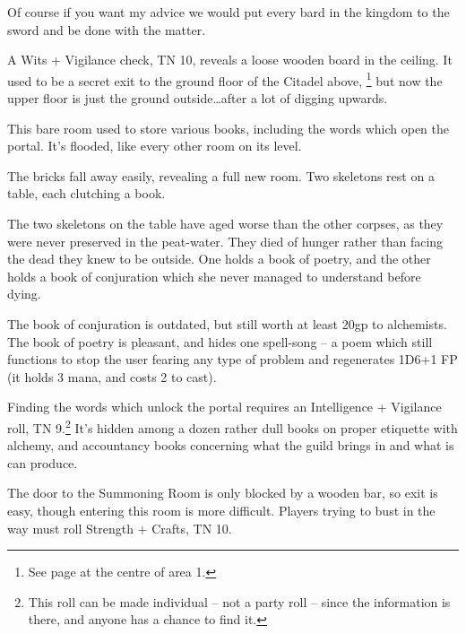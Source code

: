 \begin{multicols}{2}
\begin{exampletext}
  Of course if you want my advice we would put every bard in the kingdom to the sword and be done with the matter.

\end{exampletext}

A Wits + Vigilance check, TN 10, reveals a loose wooden board in the ceiling.
It used to be a secret exit to the ground floor of the Citadel above,%
\footnote{See page \pageref{lost_citadel} at the centre of area 1.}
but now the upper floor is just the ground outside\ldots after a lot of digging upwards.


This bare room used to store various books, including the words which open the portal.  It's flooded, like every other room on its level.

\begin{boxtext}

  The bricks fall away easily, revealing a full new room.  Two skeletons rest on a table, each clutching a book.

\end{boxtext}

The two skeletons on the table have aged worse than the other corpses, as they were never preserved in the peat-water.
They died of hunger rather than facing the dead they knew to be outside.
One holds a book of poetry, and the other holds a book of conjuration which she never managed to understand before dying.

The book of conjuration is outdated, but still worth at least 20gp to \gls{alchemists}.
The book of poetry is pleasant, and hides one spell-song -- a poem which still functions to stop the user fearing any type of problem and regenerates 1D6+1 FP (it holds 3 mana, and costs 2 to cast).

Finding the words which unlock the portal requires an Intelligence + Vigilance roll, TN 9.\footnote{This roll can be made individual -- not a party roll -- since the information is there, and anyone has a chance to find it.}
It's hidden among a dozen rather dull books on proper etiquette with alchemy, and accountancy books concerning what the guild brings in and what is can produce.

The door to the Summoning Room is only blocked by a wooden bar, so exit is easy, though entering this room is more difficult.
Players trying to bust in the way must roll Strength + Crafts, TN 10.



\end{multicols}
